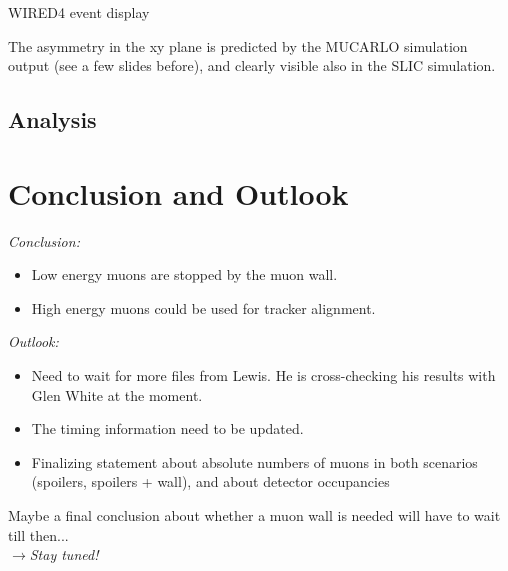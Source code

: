 \documentclass[xcolor={dvipsnames}]{beamer}
\begin{document}
\begin{frame}{WIRED4 event display}
\begin{center}
\end{center}
The asymmetry in the xy plane is predicted by the MUCARLO simulation output (see a few slides before), and clearly visible also in the SLIC simulation.
\end{frame}

\subsection{Analysis}

\section{Conclusion and Outlook}
\begin{frame}
\textit{Conclusion:}
\begin{itemize}
\item Low energy muons are stopped by the muon wall.
\item High energy muons could be used for tracker alignment.
\end{itemize}
\textit{Outlook:}
\begin{itemize}
\item Need to wait for more files from Lewis. He is cross-checking his results with Glen White at the moment.
\item The timing information need to be updated.
\item Finalizing statement about absolute numbers of muons in both scenarios (spoilers, spoilers + wall), and about detector occupancies
\end{itemize}
\alert{Maybe a final conclusion about whether a muon wall is needed will have to wait till then...\\
$\rightarrow$\textit{Stay tuned!}}
\end{frame}
\end{document}
